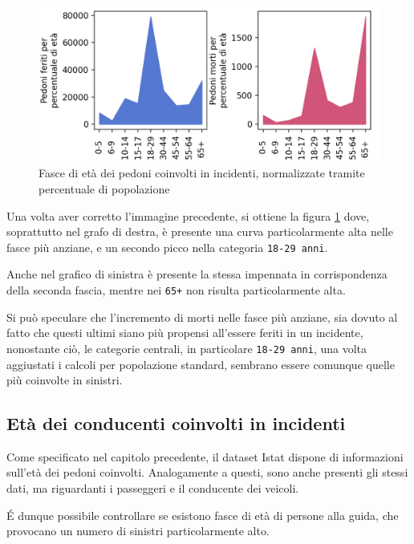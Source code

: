 \documentclass[a4paper,12pt]{report}
\newcommand{\columnstyle}[1]{\texttt{#1}}
\begin{document}
\begin{figure}
    \includegraphics[width=\linewidth]{../src/incidenti/incidenti_senza_coords/pedoni/eta_pedoni_norm.png}
    \caption{Fasce di età dei pedoni coinvolti in incidenti, normalizzate tramite percentuale di popolazione}
    \label{fig:eta-pedoni-norm}
\end{figure}

Una volta aver corretto l'immagine precedente, si ottiene la figura \ref{fig:eta-pedoni-norm} 
dove, soprattutto nel grafo di destra, è presente una curva particolarmente alta 
nelle fasce più anziane, e un secondo picco nella categoria \columnstyle{18-29 anni}.

Anche nel grafico di sinistra è presente la stessa impennata in corrispondenza 
della seconda fascia, mentre nei \columnstyle{65+} non 
risulta particolarmente alta.

Si può speculare che l'incremento di morti nelle fasce più anziane, sia dovuto al 
fatto che questi ultimi siano più propensi all'essere feriti in un incidente, 
nonostante ciò, 
le categorie centrali, in particolare \columnstyle{18-29 anni}, una volta 
aggiustati i calcoli per popolazione standard, sembrano essere comunque quelle più 
coinvolte in sinistri.

\subsection{Età dei conducenti coinvolti in incidenti}

Come specificato nel capitolo precedente, il dataset Istat dispone di 
informazioni sull'età dei pedoni coinvolti. Analogamente a questi, 
sono anche presenti gli stessi dati, ma riguardanti i passeggeri e il conducente dei 
veicoli.

\'E dunque possibile controllare se esistono fasce di età di persone alla guida, 
che provocano un numero di sinistri particolarmente alto.
\end{document}
